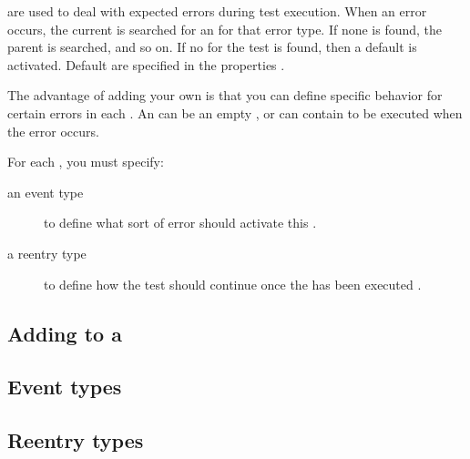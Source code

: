
\gdehandlers{} are \gdcases{} used to deal with expected errors during test execution. When an error occurs, the current \gdcase{} is searched for an \gdehandler{} for that error type. If none is found, the parent \gdcase{} is searched, and so on. If no \gdehandler{} for the test is found, then a default \gdehandler{} is activated. Default \gdehandlers{} are specified in the \gdsuite{} properties . 

The advantage of adding your own \gdehandlers{} is that you can define specific behavior for certain errors in each \gdcase{}. An \gdehandler{} can be an empty \gdcase{}, or can contain \gdcases{} to be executed when the error occurs. 

For each \gdehandler{}, you must specify:
\begin{description}
\item [an event type] {to define what sort of error should activate this \gdcase{} .} 
\item [a reentry type]{to define how the test should continue once the \gdehandler{} has been executed .}
\end{description}

\subsection{Adding \gdehandlers{} to a \gdcase{}}


\subsection{Event types}


\subsection{Reentry types}







